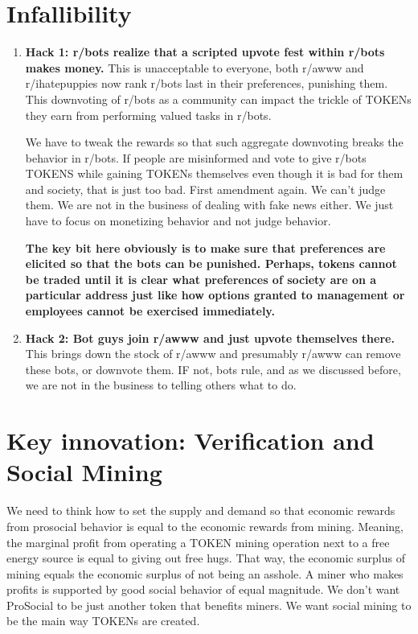 \documentclass[12pt]{article}
\begin{document}
\section*{Infallibility}
\begin{enumerate}
	\item \textbf{Hack 1: r/bots realize that a scripted upvote fest within r/bots makes money.} This is unacceptable to everyone, both r/awww and r/ihatepuppies now rank r/bots last in their preferences, punishing them. This downvoting of r/bots as a community can impact the trickle of TOKENs they earn from performing valued tasks in r/bots. 
	
	We have to tweak the rewards so that such aggregate downvoting breaks the behavior in r/bots. If people are misinformed and vote to give r/bots TOKENS while gaining TOKENs themselves even though it is bad for them and society, that is just too bad. First amendment again. We can't judge them. We are not in the business of dealing with fake news either. We just have to focus on monetizing behavior and not judge behavior.
	
	\textbf{The key bit here obviously is to make sure that preferences are elicited so that the bots can be punished. Perhaps, tokens cannot be traded until it is clear what preferences of society are on a particular address just like how options granted to management or employees cannot be exercised immediately.}
	
	\item \textbf{Hack 2: Bot guys join r/awww and just upvote themselves there.} This brings down the stock of r/awww and presumably r/awww can remove these bots, or downvote them. IF not, bots rule, and as we discussed before, we are not in the business to telling others what to do. 
	
\end{enumerate}    

\section{\textbf{Key innovation}: Verification and Social Mining}
We need to think how to set the supply and demand so that economic rewards from prosocial behavior is equal to the economic rewards from mining. Meaning, the marginal profit from operating a TOKEN mining operation next to a free energy source is equal to giving out free hugs. That way, the economic surplus of mining equals the economic surplus of not being an asshole. A miner who makes profits is supported by good social behavior of equal magnitude. We don't want ProSocial to be just another token that benefits miners. We want social mining to be the main way TOKENs are created.
\end{document}
